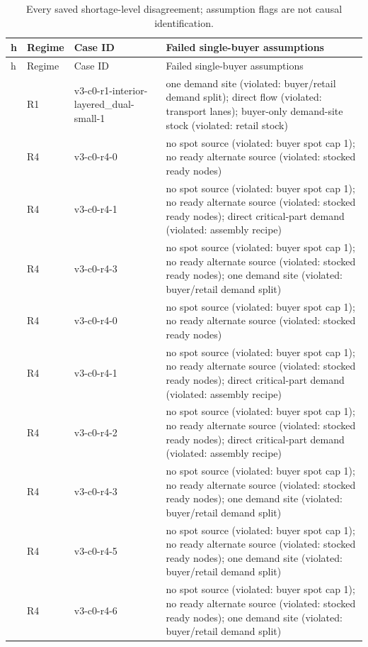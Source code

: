 \documentclass[preprint,11pt,authoryear]{elsarticle}
\begin{document}
\begin{longtable}{>{\raggedright\arraybackslash}p{0.6cm}>{\raggedright\arraybackslash}p{1.3cm}>{\raggedright\arraybackslash}p{5.4cm}>{\raggedright\arraybackslash}p{7.1cm}}
\caption{Every saved shortage-level disagreement; assumption flags are not causal identification.}\label{tab:disagreements}\\
\toprule
h & Regime & Case ID & Failed single-buyer assumptions \\
\midrule
\endfirsthead
h & Regime & Case ID & Failed single-buyer assumptions \\
\midrule
\endhead
\bottomrule\endfoot
3 & R1 & v3-c0-r1-interior-layered\_dual-small-1 & one demand site (violated: buyer/retail demand split); direct flow (violated: transport lanes); buyer-only demand-site stock (violated: retail stock) \\
3 & R4 & v3-c0-r4-0 & no spot source (violated: buyer spot cap 1); no ready alternate source (violated: stocked ready nodes) \\
3 & R4 & v3-c0-r4-1 & no spot source (violated: buyer spot cap 1); no ready alternate source (violated: stocked ready nodes); direct critical-part demand (violated: assembly recipe) \\
3 & R4 & v3-c0-r4-3 & no spot source (violated: buyer spot cap 1); no ready alternate source (violated: stocked ready nodes); one demand site (violated: buyer/retail demand split) \\
10 & R4 & v3-c0-r4-0 & no spot source (violated: buyer spot cap 1); no ready alternate source (violated: stocked ready nodes) \\
10 & R4 & v3-c0-r4-1 & no spot source (violated: buyer spot cap 1); no ready alternate source (violated: stocked ready nodes); direct critical-part demand (violated: assembly recipe) \\
10 & R4 & v3-c0-r4-2 & no spot source (violated: buyer spot cap 1); no ready alternate source (violated: stocked ready nodes); direct critical-part demand (violated: assembly recipe) \\
10 & R4 & v3-c0-r4-3 & no spot source (violated: buyer spot cap 1); no ready alternate source (violated: stocked ready nodes); one demand site (violated: buyer/retail demand split) \\
10 & R4 & v3-c0-r4-5 & no spot source (violated: buyer spot cap 1); no ready alternate source (violated: stocked ready nodes); one demand site (violated: buyer/retail demand split) \\
10 & R4 & v3-c0-r4-6 & no spot source (violated: buyer spot cap 1); no ready alternate source (violated: stocked ready nodes); one demand site (violated: buyer/retail demand split) \\

\end{longtable}
\end{document}
